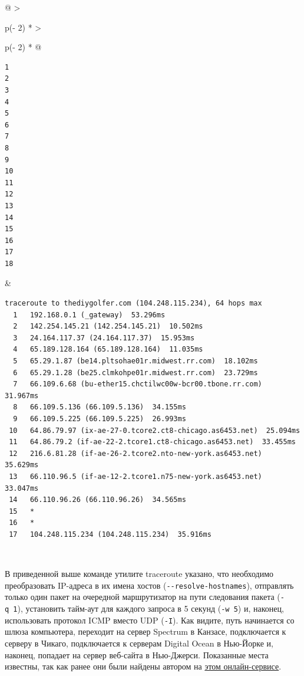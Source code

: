 \documentclass{report}
\begin{document}
\begin{longtable}[]{@{}
  >{\raggedright\arraybackslash}p{(\columnwidth - 2\tabcolsep) * }
  >{\raggedright\arraybackslash}p{(\columnwidth - 2\tabcolsep) * }@{}}
\toprule
\endhead
\begin{minipage}[t]{\linewidth}\raggedright
\begin{verbatim}
1
2
3
4
5
6
7
8
9
10
11
12
13
14
15
16
17
18
\end{verbatim}
\end{minipage} & \begin{minipage}[t]{\linewidth}\raggedright
\begin{verbatim}
traceroute to thediygolfer.com (104.248.115.234), 64 hops max
  1   192.168.0.1 (_gateway)  53.296ms
  2   142.254.145.21 (142.254.145.21)  10.502ms
  3   24.164.117.37 (24.164.117.37)  15.953ms
  4   65.189.128.164 (65.189.128.164)  11.035ms
  5   65.29.1.87 (be14.pltsohae01r.midwest.rr.com)  18.102ms
  6   65.29.1.28 (be25.clmkohpe01r.midwest.rr.com)  23.729ms
  7   66.109.6.68 (bu-ether15.chctilwc00w-bcr00.tbone.rr.com)  31.967ms
  8   66.109.5.136 (66.109.5.136)  34.155ms
  9   66.109.5.225 (66.109.5.225)  26.993ms
 10   64.86.79.97 (ix-ae-27-0.tcore2.ct8-chicago.as6453.net)  25.094ms
 11   64.86.79.2 (if-ae-22-2.tcore1.ct8-chicago.as6453.net)  33.455ms
 12   216.6.81.28 (if-ae-26-2.tcore2.nto-new-york.as6453.net)  35.629ms
 13   66.110.96.5 (if-ae-12-2.tcore1.n75-new-york.as6453.net)  33.047ms
 14   66.110.96.26 (66.110.96.26)  34.565ms
 15   *
 16   *
 17   104.248.115.234 (104.248.115.234)  35.916ms
\end{verbatim}
\end{minipage} \\ \addlinespace
\bottomrule
\end{longtable}

В приведенной выше команде утилите traceroute указано, что необходимо
преобразовать IP-адреса в их имена хостов
(\texttt{-\/-resolve-hostnames}), отправлять только один пакет на
очередной маршрутизатор на пути следования пакета (\texttt{-q\ 1}),
установить тайм-аут для каждого запроса в 5 секунд (\texttt{-w\ 5}) и,
наконец, использовать протокол ICMP вместо UDP (\texttt{-I}). Как
видите, путь начинается со шлюза компьютера, переходит на сервер
Spectrum в Канзасе, подключается к серверу в Чикаго, подключается к
серверам Digital Ocean в Нью-Йорке и, наконец, попадает на сервер
веб-сайта в Нью-Джерси. Показанные места известны, так как ранее они
были найдены автором на
\href{https://whatismyipaddress.com/ip-lookup}{этом онлайн-сервисе}.
\end{document}
